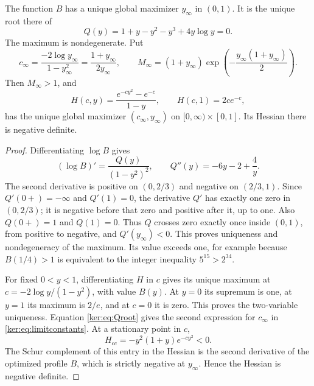 \begin{lemma}\label{ker:lem:unique-limit}
The function $B$ has a unique global maximizer $y_\infty$ in $(0,1)$.
It is the unique root there of
\begin{equation}\label{ker:eq:Qroot}
 Q(y)=1+y-y^2-y^3+4y\log y=0.
\end{equation}
The maximum is nondegenerate. Put
\begin{equation}\label{ker:eq:limitconstants}
 c_\infty=\frac{-2\log y_\infty}{1-y_\infty^2}
           =\frac{1+y_\infty}{2y_\infty},\qquad
 M_\infty=(1+y_\infty)
      \exp\!\left(-\frac{y_\infty(1+y_\infty)}2\right).
\end{equation}
Then $M_\infty>1$, and
\[
 H(c,y)=\frac{e^{-cy^2}-e^{-c}}{1-y},\qquad
 H(c,1)=2ce^{-c},
\]
has the unique global maximizer $(c_\infty,y_\infty)$ on
$[0,\infty)\times[0,1]$. Its Hessian there is negative definite.
\end{lemma}
\begin{proof}
Differentiating $\log B$ gives
\[
 (\log B)'=\frac{Q(y)}{(1-y^2)^2},\qquad
 Q''(y)=-6y-2+\frac4y.
\]
The second derivative is positive on $(0,2/3)$ and negative on
$(2/3,1)$. Since $Q'(0+)=-\infty$ and $Q'(1)=0$, the derivative
$Q'$ has exactly one zero in $(0,2/3)$; it is negative before that
zero and positive after it, up to one. Also $Q(0+)=1$ and $Q(1)=0$.
Thus $Q$ crosses zero exactly once inside $(0,1)$, from positive to
negative, and $Q'(y_\infty)<0$. This proves uniqueness and
nondegeneracy of the maximum. Its value exceeds one, for example
because $B(1/4)>1$ is equivalent to the integer inequality
$5^{15}>2^{34}$.

For fixed $0<y<1$, differentiating $H$ in $c$ gives its unique maximum
at $c=-2\log y/(1-y^2)$, with value $B(y)$. At $y=0$ its supremum
is one, at $y=1$ its maximum is $2/e$, and at $c=0$ it is zero.
This proves the two-variable uniqueness. Equation \eqref{ker:eq:Qroot}
gives the second expression for $c_\infty$ in
\eqref{ker:eq:limitconstants}.
At a stationary point in $c$,
\[
 H_{cc}=-y^2(1+y)e^{-cy^2}<0.
\]
The Schur complement of this entry in the Hessian is the second
derivative of the optimized profile $B$, which is strictly negative
at $y_\infty$. Hence the Hessian is negative definite.
\end{proof}

